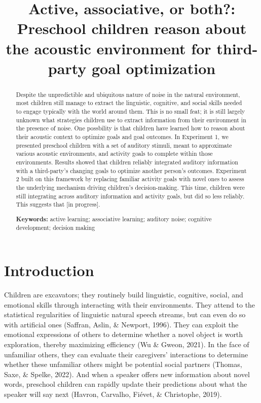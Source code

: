 \documentclass[10pt, letterpaper]{article}
\title{Active, associative, or both?: Preschool children reason about
the acoustic environment for third-party goal optimization}
\begin{document}
\maketitle

\begin{abstract}
Despite the unpredictible and ubiquitous nature of noise in the natural
environment, most children still manage to extract the linguistic,
cognitive, and social skills needed to engage typically with the world
around them. This is no small feat; it is still largely unknown what
strategies children use to extract information from their environment in
the presence of noise. One possbility is that children have learned how
to reason about their acoustic context to optimize goals and goal
outcomes. In Experiment 1, we presented preschool children with a set of
auditory stimuli, meant to approximate various acoustic environments,
and activity goals to complete within those environments. Results showed
that children reliably integrated auditory information with a
third-party's changing goals to optimize another person's outcomes.
Experiment 2 built on this framework by replacing familiar activity
goals with novel ones to assess the underlying mechanism driving
children's decision-making. This time, children were still integrating
across auditory information and activity goals, but did so less
reliably. This suggests that {[}in progress{]}.

\textbf{Keywords:}
active learning; associative learning; auditory noise; cognitive
development; decision making
\end{abstract}

\hypertarget{introduction}{%
\section{Introduction}\label{introduction}}

Children are excavators; they routinely build linguistic, cognitive,
social, and emotional skills through interacting with their
environments. They attend to the statistical regularities of linguistic
natural speech streams, but can even do so with artificial ones
(Saffran, Aslin, \& Newport, 1996). They can exploit the emotional
expressions of others to determine whether a novel object is worth
exploration, thereby maximizing efficiency (Wu \& Gweon, 2021). In the
face of unfamiliar others, they can evaluate their caregivers'
interactions to determine whether these unfamiliar others might be
potential social partners (Thomas, Saxe, \& Spelke, 2022). And when a
speaker offers new information about novel words, preschool children can
rapidly update their predictions about what the speaker will say next
(Havron, Carvalho, Fiévet, \& Christophe, 2019).
\end{document}
